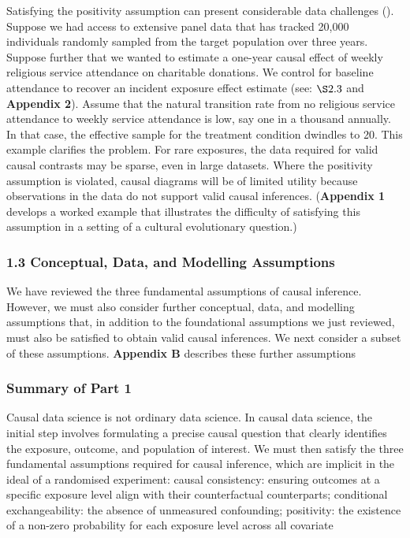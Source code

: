 \documentclass[
  singlecolumn]{article}
\begin{document}
Satisfying the positivity assumption can present considerable data
challenges ().
Suppose we had access to extensive panel data that has tracked 20,000
individuals randomly sampled from the target population over three
years. Suppose further that we wanted to estimate a one-year causal
effect of weekly religious service attendance on charitable donations.
We control for baseline attendance to recover an incident exposure
effect estimate (see: \(\S 2.3\) and \textbf{Appendix 2}). Assume that
the natural transition rate from no religious service attendance to
weekly service attendance is low, say one in a thousand annually. In
that case, the effective sample for the treatment condition dwindles to
20. This example clarifies the problem. For rare exposures, the data
required for valid causal contrasts may be sparse, even in large
datasets. Where the positivity assumption is violated, causal diagrams
will be of limited utility because observations in the data do not
support valid causal inferences. (\textbf{Appendix 1} develops a worked
example that illustrates the difficulty of satisfying this assumption in
a setting of a cultural evolutionary question.)

\subsubsection{1.3 Conceptual, Data, and Modelling
Assumptions}\label{conceptual-data-and-modelling-assumptions}

We have reviewed the three fundamental assumptions of causal inference.
However, we must also consider further conceptual, data, and modelling
assumptions that, in addition to the foundational assumptions we just
reviewed, must also be satisfied to obtain valid causal inferences. We
next consider a subset of these assumptions. \textbf{Appendix B}
describes these further assumptions

\subsubsection{Summary of Part 1}\label{summary-of-part-1}

Causal data science is not ordinary data science. In causal data
science, the initial step involves formulating a precise causal question
that clearly identifies the exposure, outcome, and population of
interest. We must then satisfy the three fundamental assumptions
required for causal inference, which are implicit in the ideal of a
randomised experiment: causal consistency: ensuring outcomes at a
specific exposure level align with their counterfactual counterparts;
conditional exchangeability: the absence of unmeasured confounding;
positivity: the existence of a non-zero probability for each exposure
level across all covariate
\end{document}
